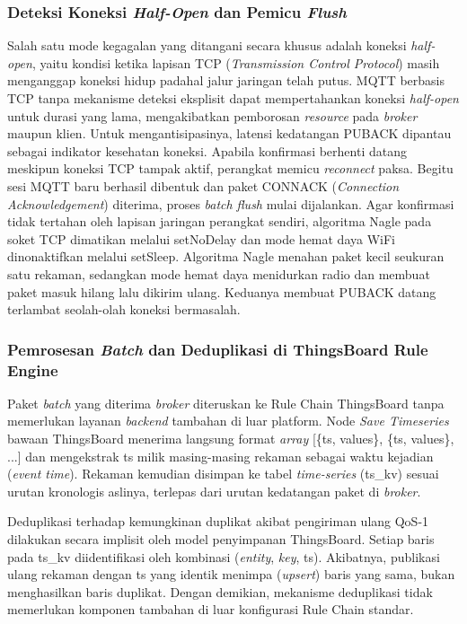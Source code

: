 \subsubsection{Deteksi Koneksi \textit{Half-Open} dan Pemicu \textit{Flush}}

Salah satu mode kegagalan yang ditangani secara khusus adalah koneksi \textit{half-open},
yaitu kondisi ketika lapisan TCP (\textit{Transmission Control Protocol}) masih menganggap koneksi hidup padahal jalur jaringan
telah putus. MQTT berbasis TCP tanpa mekanisme deteksi eksplisit dapat mempertahankan
koneksi \textit{half-open} untuk durasi yang lama, mengakibatkan pemborosan \textit{resource} pada
\textit{broker} maupun klien. Untuk mengantisipasinya, latensi kedatangan PUBACK dipantau sebagai
indikator kesehatan koneksi. Apabila konfirmasi berhenti datang meskipun koneksi TCP
tampak aktif, perangkat memicu \textit{reconnect} paksa. Begitu sesi MQTT baru berhasil
dibentuk dan paket CONNACK (\textit{Connection Acknowledgement}) diterima, proses \textit{batch} \textit{flush} mulai
dijalankan. Agar konfirmasi tidak tertahan oleh lapisan jaringan perangkat sendiri,
algoritma Nagle pada soket TCP dimatikan melalui setNoDelay dan mode hemat daya WiFi
dinonaktifkan melalui setSleep. Algoritma Nagle menahan paket kecil seukuran satu
rekaman, sedangkan mode hemat daya menidurkan radio dan membuat paket masuk hilang
lalu dikirim ulang. Keduanya membuat PUBACK datang terlambat seolah-olah
koneksi bermasalah.

\subsubsection{Pemrosesan \textit{Batch} dan Deduplikasi di ThingsBoard Rule Engine}

Paket \textit{batch} yang diterima \textit{broker} diteruskan ke Rule Chain ThingsBoard tanpa memerlukan
layanan \textit{backend} tambahan di luar platform. Node \textit{Save Timeseries} bawaan
ThingsBoard menerima langsung format \textit{array} [\{ts, values\}, \{ts, values\}, ...]
dan mengekstrak ts milik masing-masing rekaman sebagai waktu kejadian (\textit{event time}).
Rekaman kemudian disimpan ke tabel \textit{time-series} (ts\_kv) sesuai urutan kronologis aslinya, terlepas
dari urutan kedatangan paket di \textit{broker}.

Deduplikasi terhadap kemungkinan duplikat akibat pengiriman ulang QoS-1 dilakukan secara
implisit oleh model penyimpanan ThingsBoard. Setiap baris pada ts\_kv
diidentifikasi oleh kombinasi (\textit{entity}, \textit{key}, ts). Akibatnya, publikasi
ulang rekaman dengan ts yang identik menimpa (\textit{upsert}) baris yang sama, bukan
menghasilkan baris duplikat. Dengan demikian, mekanisme deduplikasi tidak memerlukan
komponen tambahan di luar konfigurasi Rule Chain standar.

